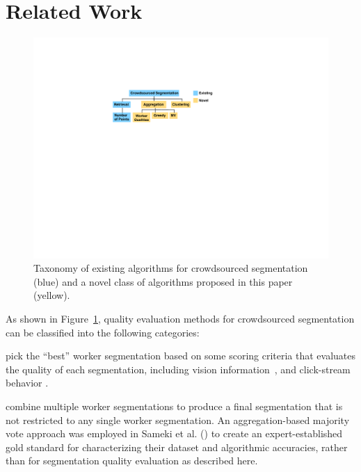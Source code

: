 \section{Related Work\label{sec:related}}
\begin{figure}[h!]
\centering
\includegraphics[width=0.75\linewidth]{plots/flowchart.pdf}
\caption{Taxonomy of existing algorithms for crowdsourced segmentation (blue) and a novel class of algorithms proposed in this paper (yellow).} %
\label{flowchart}
\end{figure}
As shown in Figure~\ref{flowchart}, quality evaluation methods for crowdsourced segmentation can be classified into the following categories:

 pick the ``best'' worker segmentation based on some scoring criteria that evaluates the quality of each segmentation, including vision information~\cite{Vittayakorn2011,Russakovsky2015}, and click-stream behavior \cite{Cabezas2015,Sameki2015,Sorokin2008}.

 combine multiple worker segmentations to produce a final segmentation that is not restricted to any single worker segmentation. An aggregation-based majority vote approach was employed in Sameki et al. (\citeyear{Sameki2015}) to create an expert-established gold standard for characterizing their dataset and algorithmic accuracies, rather than for segmentation quality evaluation as described here.

